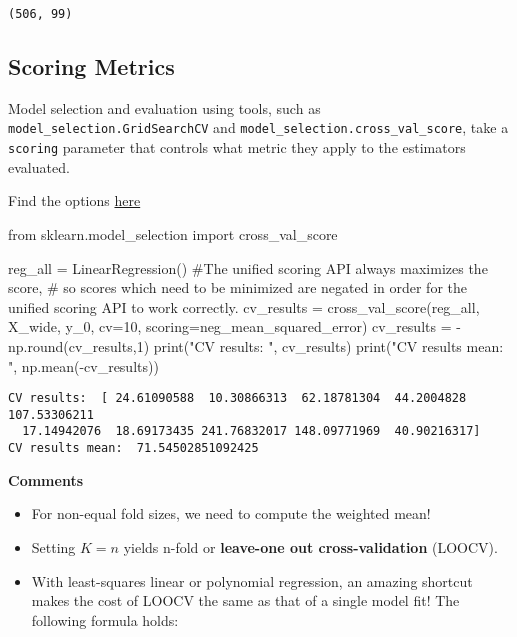 \documentclass[
  letterpaper,
  DIV=11,
  numbers=noendperiod]{scrreprt}
\newenvironment{Shaded}{\begin{snugshade}}{\end{snugshade}}
\newcommand{\BuiltInTok}[1]{\textcolor[rgb]{0.00,0.23,0.31}{#1}}
\newcommand{\CommentTok}[1]{\textcolor[rgb]{0.37,0.37,0.37}{#1}}
\newcommand{\DecValTok}[1]{\textcolor[rgb]{0.68,0.00,0.00}{#1}}
\newcommand{\ImportTok}[1]{\textcolor[rgb]{0.00,0.46,0.62}{#1}}
\newcommand{\NormalTok}[1]{\textcolor[rgb]{0.00,0.23,0.31}{#1}}
\newcommand{\OperatorTok}[1]{\textcolor[rgb]{0.37,0.37,0.37}{#1}}
\newcommand{\StringTok}[1]{\textcolor[rgb]{0.13,0.47,0.30}{#1}}
\providecommand{\tightlist}{%
  \setlength{\itemsep}{0pt}\setlength{\parskip}{0pt}}\usepackage{longtable,booktabs,array}
\begin{document}
\begin{verbatim}
(506, 99)
\end{verbatim}

\hypertarget{scoring-metrics}{%
\subsection{Scoring Metrics}\label{scoring-metrics}}

Model selection and evaluation using tools, such as
\texttt{model\_selection.GridSearchCV} and
\texttt{model\_selection.cross\_val\_score}, take a \texttt{scoring}
parameter that controls what metric they apply to the estimators
evaluated.

Find the options
\href{https://scikit-learn.org/stable/modules/model_evaluation.html\#scoring-parameter}{here}

\begin{Shaded}
\begin{Highlighting}[]
\ImportTok{from}\NormalTok{ sklearn.model\_selection }\ImportTok{import}\NormalTok{ cross\_val\_score}

\NormalTok{reg\_all }\OperatorTok{=}\NormalTok{ LinearRegression()}
\CommentTok{\#The unified scoring API always maximizes the score, }
\CommentTok{\# so scores which need to be minimized are negated in order for the unified scoring API to work correctly.}
\NormalTok{cv\_results }\OperatorTok{=}\NormalTok{ cross\_val\_score(reg\_all, X\_wide, y\_0, cv}\OperatorTok{=}\DecValTok{10}\NormalTok{, scoring}\OperatorTok{=}\StringTok{\textquotesingle{}neg\_mean\_squared\_error\textquotesingle{}}\NormalTok{)}
\NormalTok{cv\_results }\OperatorTok{=} \OperatorTok{{-}}\NormalTok{np.}\BuiltInTok{round}\NormalTok{(cv\_results,}\DecValTok{1}\NormalTok{)}
\BuiltInTok{print}\NormalTok{(}\StringTok{"CV results: "}\NormalTok{, cv\_results)}
\BuiltInTok{print}\NormalTok{(}\StringTok{"CV results mean: "}\NormalTok{, np.mean(}\OperatorTok{{-}}\NormalTok{cv\_results))}
\end{Highlighting}
\end{Shaded}

\begin{verbatim}
CV results:  [ 24.61090588  10.30866313  62.18781304  44.2004828  107.53306211
  17.14942076  18.69173435 241.76832017 148.09771969  40.90216317]
CV results mean:  71.54502851092425
\end{verbatim}

\textbf{Comments}

\begin{itemize}
\tightlist
\item
  For non-equal fold sizes, we need to compute the weighted mean!
\item
  Setting \(K = n\) yields n-fold or \textbf{leave-one out
  cross-validation} (LOOCV).
\item
  With least-squares linear or polynomial regression, an amazing
  shortcut makes the cost of LOOCV the same as that of a single model
  fit! The following formula holds:
\end{itemize}
\end{document}
